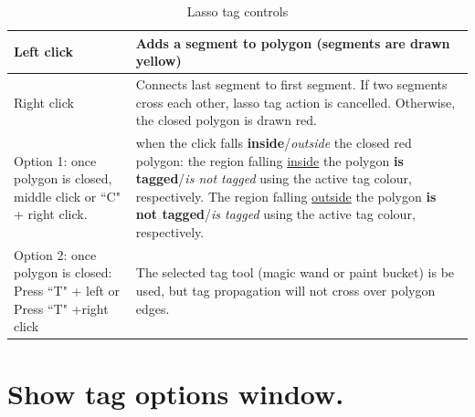 \begin{table}
\begin{tabularx}{\linewidth}{ | X | X | }
\hline			
Left click & Adds a segment to polygon (segments are drawn yellow) \\ \hline			

Right click & Connects last segment to first segment. If two segments cross each other, lasso tag action is cancelled. Otherwise, the closed polygon is drawn red.\\ \hline			

Option 1: once polygon is closed, middle click or ``C" + right click. & when the click falls \textbf{inside}/\textit{outside} the closed red
polygon: the region falling \underline{inside} the polygon
\textbf{is tagged}/\textit{is not tagged} using the active tag
colour, respectively. The region falling \underline{outside}
the polygon \textbf{is not tagged}/\textit{is tagged} using the
active tag colour, respectively.

\\ \hline			
Option 2: once polygon is closed: Press ``T" + left or Press ``T" +right click  & The selected tag tool (magic wand or paint bucket) is be used, but tag propagation will not
cross over polygon edges.
\\ \hline	
		

\end{tabularx}
\caption{Lasso tag controls}	
\label{lasso_tag_controls}	
\end{table}

\section{Show tag options window.}

